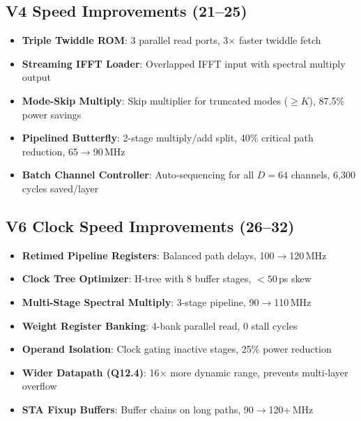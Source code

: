 \documentclass[11pt,a4paper]{article}
\theoremstyle{definition}
\theoremstyle{remark}
\begin{document}
\subsection{V4 Speed Improvements (21--25)}
\begin{itemize}[noitemsep]
  \item \textbf{Triple Twiddle ROM}: 3 parallel read ports, 3$\times$ faster twiddle fetch
  \item \textbf{Streaming IFFT Loader}: Overlapped IFFT input with spectral multiply output
  \item \textbf{Mode-Skip Multiply}: Skip multiplier for truncated modes ($\geq K$), 87.5\% power savings
  \item \textbf{Pipelined Butterfly}: 2-stage multiply/add split, 40\% critical path reduction, 65$\to$90\,MHz
  \item \textbf{Batch Channel Controller}: Auto-sequencing for all $D=64$ channels, 6{,}300 cycles saved/layer
\end{itemize}

\subsection{V6 Clock Speed Improvements (26--32)}
\begin{itemize}[noitemsep]
  \item \textbf{Retimed Pipeline Registers}: Balanced path delays, 100$\to$120\,MHz
  \item \textbf{Clock Tree Optimizer}: H-tree with 8 buffer stages, $<50$\,ps skew
  \item \textbf{Multi-Stage Spectral Multiply}: 3-stage pipeline, 90$\to$110\,MHz
  \item \textbf{Weight Register Banking}: 4-bank parallel read, 0 stall cycles
  \item \textbf{Operand Isolation}: Clock gating inactive stages, 25\% power reduction
  \item \textbf{Wider Datapath (Q12.4)}: 16$\times$ more dynamic range, prevents multi-layer overflow
  \item \textbf{STA Fixup Buffers}: Buffer chains on long paths, 90$\to$120+\,MHz
\end{itemize}
\end{document}
